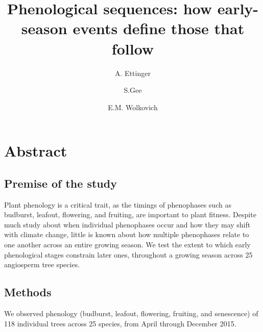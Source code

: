 \documentclass{article}
\begin{document}

\title{Phenological sequences: how early-season events define those that follow} %
\author[1,2,a]{A. Ettinger}
\author[1]{S.Gee}
\author[1,3]{E.M. Wolkovich}

\maketitle %


\section*{Abstract}
\subsection*{Premise of the study}
Plant phenology is a critical trait, as the timings of phenophases such as budburst, leafout, flowering, and fruiting, are important to plant fitness. Despite much study about when individual phenophases occur and how they may shift with climate change, little is known about how multiple phenophases relate to one another across an entire growing season. We test the extent to which early phenological stages constrain later ones, throughout a growing season across 25 angiosperm tree species. 
\subsection*{Methods}
We observed phenology (budburst, leafout, flowering, fruiting, and senescence) of 118 individual trees across 25 species, from April through December 2015. 
\end{document}
